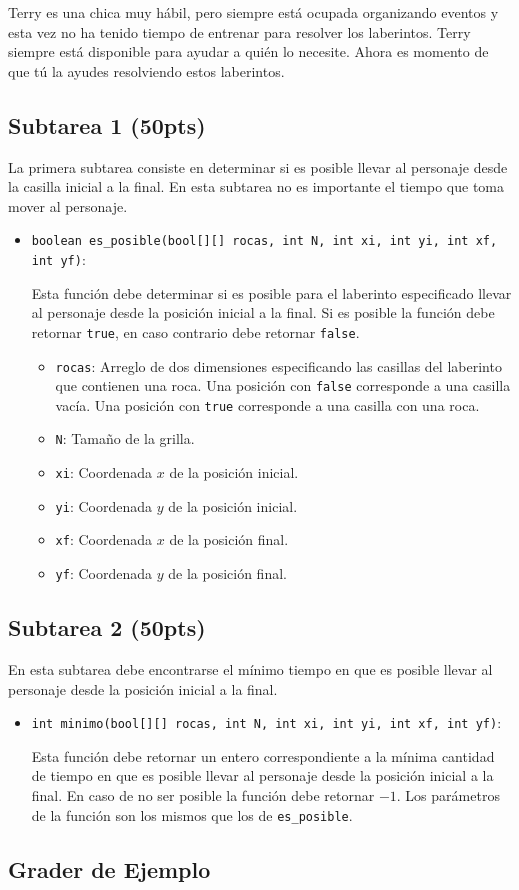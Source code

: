 \documentclass{oci}
\begin{document}
Terry es una chica muy hábil, pero siempre está ocupada organizando eventos y esta vez no ha tenido tiempo de entrenar para resolver los laberintos.
Terry siempre está disponible para ayudar a quién lo necesite.
Ahora es momento de que tú la ayudes resolviendo estos laberintos.

\subsection*{Subtarea 1 (50pts)}
La primera subtarea consiste en determinar si es posible llevar al personaje desde la casilla inicial a la final.
En esta subtarea no es importante el tiempo que toma mover al personaje.

\begin{itemize}
	\item \verb+boolean es_posible(bool[][] rocas, int N, int xi, int yi, int xf, int yf)+:

Esta función debe determinar si es posible para el laberinto especificado llevar al personaje desde la posición inicial a la final.
  Si es posible la función debe retornar \texttt{true}, en caso contrario debe retornar \texttt{false}.
  \begin{itemize}
    \item \texttt{rocas}: Arreglo de dos dimensiones especificando las casillas del laberinto que contienen una roca.
      Una posición con \texttt{false} corresponde a una casilla vacía. Una posición con \texttt{true} corresponde a una casilla con una roca.
    \item \texttt{N}: Tamaño de la grilla.
    \item \texttt{xi}: Coordenada $x$ de la posición inicial.
    \item \texttt{yi}: Coordenada $y$ de la posición inicial.
    \item \texttt{xf}: Coordenada $x$ de la posición final.
    \item \texttt{yf}: Coordenada $y$ de la posición final.
  \end{itemize}
\end{itemize}

\subsection*{Subtarea 2 (50pts)}
En esta subtarea debe encontrarse el mínimo tiempo en que es posible llevar al personaje desde la posición inicial a la final.

\begin{itemize}
	\item \verb+int minimo(bool[][] rocas, int N, int xi, int yi, int xf, int yf)+:

	Esta función debe retornar un entero correspondiente a la mínima cantidad de tiempo en que es posible llevar al personaje desde la posición inicial a la final.
  En caso de no ser posible la función debe retornar $-1$.
  Los parámetros de la función son los mismos que los de \verb+es_posible+.
\end{itemize}

\subsection*{Grader de Ejemplo}
\end{document}
